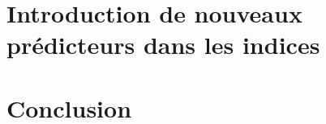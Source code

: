 \documentclass[12pt,twoside,openright]{book}
\begin{document}
\chapter{Introduction de nouveaux prédicteurs dans les indices}\label{chap:chapitre_4}


\chapter*{Conclusion}


% 

\printbibliography
%
\end{document}

